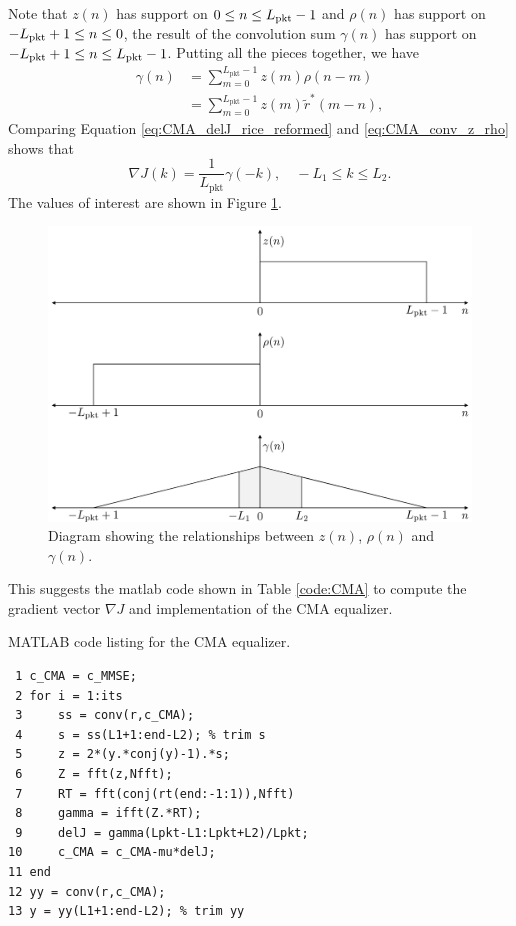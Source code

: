 Note that $z(n)$ has support on $0 \leq n \leq L_\text{pkt}-1$ and 
$\rho(n)$ has support on $-L_\text{pkt}+1 \leq n \leq 0$, 
the result of the convolution sum $\gamma(n)$ has support on $-L_\text{pkt}+1 \leq n \leq L_\text{pkt}-1$.
Putting all the pieces together, we have
\begin{align}
\gamma(n) 	&= \sum^{L_\text{pkt}-1}_{m=0} z(m) \rho(n-m) \nonumber \\
	 		&= \sum^{L_\text{pkt}-1}_{m=0} z(m) \tilde{r}^\ast(m-n),
	 \label{eq:CMA_conv_z_rho}
\end{align}
Comparing Equation \eqref{eq:CMA_delJ_rice_reformed} and \eqref{eq:CMA_conv_z_rho} shows that 
\begin{equation}
\nabla J(k) = \frac{1}{L_\text{pkt}} \gamma(-k), \quad -L_1 \leq k \leq L_2.
\label{eq:CMA_delJ_donzo}
\end{equation}
The values of interest are shown in Figure \ref{fig:convolutionFigureRice}.
\begin{figure}
	\centering\includegraphics[width=10in/100*55]{figures/eq_equations/convolutionFigureRice.pdf}
	\caption{Diagram showing the relationships between $z(n)$, $\rho(n)$ and $\gamma(n)$.}
	\label{fig:convolutionFigureRice}
\end{figure}
This suggests the matlab code shown in Table \ref{code:CMA} to compute the gradient vector $\nabla J$ and implementation of the CMA equalizer.
\begin{table}
\caption{MATLAB code listing for the CMA equalizer.}
\label{code:CMA}
\singlespacing
{\footnotesize
\begin{verbatim}
 1 c_CMA = c_MMSE;
 2 for i = 1:its
 3 	   ss = conv(r,c_CMA);
 4     s = ss(L1+1:end-L2); % trim s
 5     z = 2*(y.*conj(y)-1).*s;
 6     Z = fft(z,Nfft);
 7     RT = fft(conj(rt(end:-1:1)),Nfft)
 8     gamma = ifft(Z.*RT);
 9     delJ = gamma(Lpkt-L1:Lpkt+L2)/Lpkt;
10     c_CMA = c_CMA-mu*delJ;
11 end
12 yy = conv(r,c_CMA);
13 y = yy(L1+1:end-L2); % trim yy
\end{verbatim}
}
\end{table}
\doublespacing

